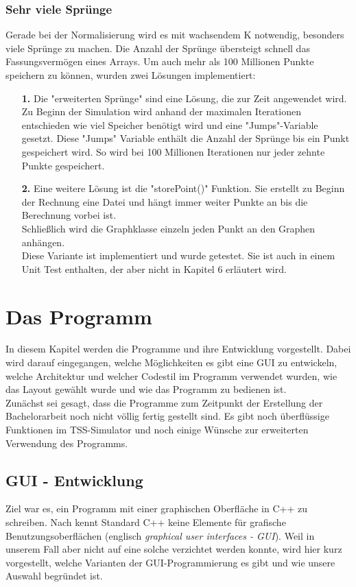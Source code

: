 \documentclass[11pt, a4paper, german]{article}
\theoremstyle{plain}
\begin{document}
	\subsubsection{Sehr viele Sprünge}
	Gerade bei der Normalisierung wird es mit wachsendem K notwendig, besonders viele Sprünge zu machen. Die Anzahl der Sprünge übersteigt schnell das Fassungsvermögen eines Arrays.	Um auch mehr als 100 Millionen Punkte speichern zu können, wurden zwei Lösungen implementiert:\\
	\begin{itemize}
		\item[\textbf{1.}] Die "{}erweiterten Sprünge"{} sind eine Lösung, die zur Zeit angewendet wird. Zu Beginn der Simulation wird anhand der maximalen Iterationen entschieden wie viel Speicher benötigt wird und eine "{}Jumps"{}-Variable gesetzt. Diese "{}Jumps"{} Variable enthält die Anzahl der Spr\-ünge bis ein Punkt gespeichert wird. So wird bei 100 Millionen Iterationen nur jeder zehnte Punkte gespeichert. \\
		\item[\textbf{2.}] Eine weitere Lösung ist die "{}storePoint()"{} Funktion. Sie erstellt zu Beginn der Rechnung eine Datei und hängt immer weiter Punkte an bis die Berechnung vorbei ist.\\
		Schließlich wird die Graphklasse einzeln jeden Punkt an den Graphen anhängen.\\ 
		Diese Variante ist implementiert und wurde getestet. Sie ist auch in einem Unit Test enthalten, der aber nicht in Kapitel 6 erläutert wird.
	\end{itemize}

	
\section{Das Programm}
In diesem Kapitel werden die Programme und ihre Entwicklung vorgestellt. Dabei wird darauf eingegangen, welche Möglichkeiten es gibt eine GUI zu entwickeln, welche Architektur und welcher Codestil im Programm verwendet wurden, wie das Layout gewählt wurde und wie das Programm zu bedienen ist.\\
Zunächst sei gesagt, dass die Programme zum Zeitpunkt der Erstellung der Bachelorarbeit noch nicht völlig fertig gestellt sind. Es gibt noch überflüssige Funktionen im TSS-Simulator und noch einige Wünsche zur erweiterten Verwendung des Programms. 

	\subsection{GUI - Entwicklung}
	Ziel war es, ein Programm mit einer graphischen Oberfläche in C++ zu schreiben. Nach \cite[14 - Grafische Benutzungsschnittstellen]{breymann2011c++} kennt Standard C++ keine Elemente für grafische Benutzungsoberflächen (englisch \textit{graphical user interfaces - GUI}). Weil in unserem Fall aber nicht auf eine solche verzichtet werden konnte, wird hier kurz vorgestellt, welche Varianten der GUI-Programmierung es gibt und wie unsere Auswahl begründet ist.\\
	
\end{document}
